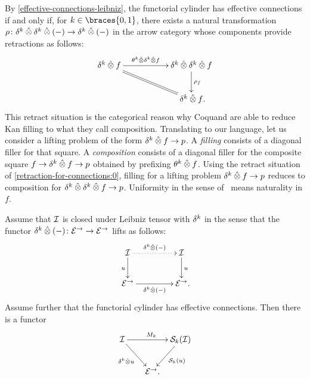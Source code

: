 \documentclass[reqno,10pt,a4paper,oneside,draft]{amsart}
\begin{document}
\begin{remark} \label{retraction-for-connections}
By \cref{effective-connections-leibniz}, the functorial cylinder has effective connections if and only if, for $k \in \braces{0, 1}$, there exists a natural transformation $\rho \co \kcyl \hatotimes \kcyl \hatotimes (-) \to \kcyl \hatotimes (-)$ in the arrow category whose components provide retractions as follows:
\begin{equation} \label{retraction-for-connections:0}
\xymatrix@C+3em{
  \kcyl \hatotimes f
  \ar[r]^-{\thetak \hatotimes \kcyl \hatotimes f}
  \ar@{=}[dr]
&
  \kcyl \hatotimes \kcyl \hatotimes f
  \ar[d]^{\rho_f}
\\&
  \kcyl \hatotimes f
\rlap{.}}
\end{equation}
This retract situation is the categorical reason why Coquand \etal\cite{cohen-et-al:cubicaltt} are able to reduce Kan filling to what they call composition.
Translating to our language, let us consider a lifting problem of the form $\kcyl \hatotimes f \to p$.
A \emph{filling} consists of a diagonal filler for that square.
A \emph{composition} consists of a diagonal filler for the composite square $f \to \kcyl \hatotimes f \to p$ obtained by prefixing $\theta^k \hatotimes f$.
Using the retract situation of \eqref{retraction-for-connections:0}, filling for a lifting problem $\kcyl \hatotimes f \to p$ reduces to composition for $\kcyl \hatotimes \kcyl \hatotimes f \to p$.
Uniformity in the sense of~\cite{cohen-et-al:cubicaltt} means naturality in $f$.
\end{remark}






\begin{lemma} \label{lem:to-strong-hequiv}
Assume that $\cal{I}$ is closed under Leibniz tensor with $\kcyl$ in the sense that the functor $\kcyl \hatotimes (-) \co \catE^\to \to \catE^\to$ lifts as follows:
\begin{equation}
\label{to-strong-hequiv:0}
\begin{gathered}
\xymatrix@C+2em{
  \cal{I}
  \ar[d]_{u}
  \ar@{.>}[r]^{\kcyl \hatotimes (-)}
&
  \cal{I}
  \ar[d]^{u}
\\
  \catE^\to
  \ar[r]_{\kcyl \hatotimes (-)}
&
  \catE^\to
\rlap{.}}
\end{gathered}
\end{equation}
Assume further that the functorial cylinder has effective connections.
Then there is a functor
\[
\xymatrix@!C@C-2em{
  \cal{I}
  \ar[dr]_{\kcyl \hatotimes u} \ar[rr]^{M_k}
&&
  \cal{S}_k(\cal{I})
  \ar[dl]^{\cal{S}_k(u)}
\\&
   \catE^\to
\rlap{.}}
\]
\end{lemma}
\end{document}
